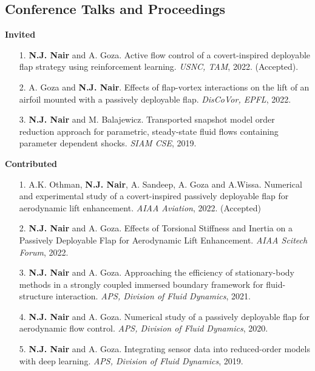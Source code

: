 \documentclass[margin]{res}
\begin{document}
\begin{resume}
\section{\large Conference Talks and Proceedings}

\textbf{Invited}

\begin{itemize} 
	
 \item[1.] \textbf{N.J. Nair} and A. Goza. Active flow control of a covert-inspired deployable flap strategy using reinforcement learning. \textit{USNC, TAM}, 2022. (Accepted).
 
 \item[2.] A. Goza and \textbf{N.J. Nair}. Effects of flap-vortex interactions on the lift of an airfoil mounted with a passively deployable flap. \textit{DisCoVor, EPFL}, 2022.
 
 \item[3.] \textbf{N.J. Nair} and M. Balajewicz. Transported snapshot model order reduction approach for parametric, steady-state fluid flows containing parameter dependent shocks. \textit{SIAM CSE}, 2019.
 
\end{itemize}


\newpage
\textbf{Contributed} 
\begin{itemize}

 \item[1.] A.K. Othman, \textbf{N.J. Nair}, A. Sandeep, A. Goza and A.Wissa. Numerical and experimental study of a covert-inspired
passively deployable flap for aerodynamic lift enhancement. \textit{AIAA Aviation}, 2022. (Accepted)

 \item[2.] \textbf{N.J. Nair} and A. Goza. Effects of Torsional Stiffness and Inertia on a Passively Deployable Flap for Aerodynamic Lift Enhancement. \textit{AIAA Scitech Forum}, 2022.
 
 \item[3.] \textbf{N.J. Nair} and A. Goza. Approaching the efficiency of stationary-body methods in a strongly coupled immersed boundary framework for fluid-structure interaction. \textit{APS, Division of Fluid Dynamics}, 2021.
	
 \item[4.] \textbf{N.J. Nair} and A. Goza. Numerical study of a passively deployable flap for aerodynamic flow control. \textit{APS, Division of Fluid Dynamics}, 2020.
 
 \item[5.] \textbf{N.J. Nair} and A. Goza. Integrating sensor data into reduced-order models with deep learning. \textit{APS, Division of Fluid Dynamics}, 2019.


\end{itemize}
\end{resume}
\end{document}
